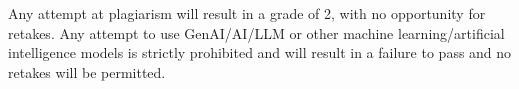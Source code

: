 \begin{infobox}[title=ATTENTION]
\vspace*{\fill}
Any attempt at plagiarism will result in a grade of 2, with no opportunity for retakes. Any attempt to use GenAI/AI/LLM or other machine learning/artificial intelligence models is strictly prohibited and will result in a failure to pass and no retakes will be permitted.
\vspace*{\fill}
\end{infobox}
